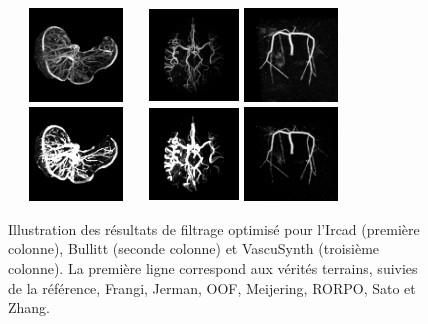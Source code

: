 \begin{figure}[!ht]
  \\
  \includegraphics[clip = true, trim  =  10 150 10 150, height=25mm,width=36mm]{Images/Ircad_Sato.png}
  \includegraphics[clip = true, trim = 90 20 90 20,  height=25mm,width=24mm]{Images/Bullitt_Sato.png}
  \includegraphics[clip = true, trim = 80 80 80 80, height=25mm]{Images/Vascu_4_Sato.png}
  \\
  \includegraphics[clip = true, trim  =  10 150 10 150, height=25mm,width=36mm]{Images/Ircad_Zhang.png}
  \includegraphics[clip = true, trim = 90 20 90 20, height=25mm,width=24mm]{Images/Bullitt_Zhang.png}
  \includegraphics[clip = true, trim = 80 80 80 80, height=25mm]{Images/Vascu_4_Zhang.png}

  \caption{Illustration des résultats de filtrage optimisé pour l'Ircad (première colonne), Bullitt (seconde colonne) et  VascuSynth (troisième colonne).
  La première ligne correspond aux vérités terrains, suivies de la référence, Frangi, Jerman, OOF, Meijering, RORPO, Sato et Zhang.}
  \label{fig:quanlitative results}
\end{figure}

